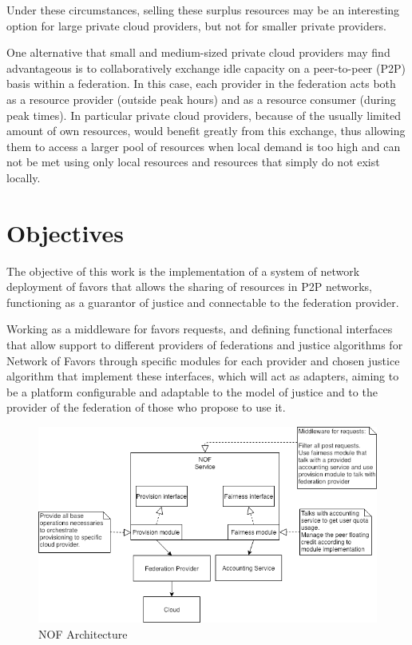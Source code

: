 \documentclass{article}
\begin{document}
Under these circumstances, selling these surplus resources may be an interesting option for large private cloud providers, but not for smaller private providers.

One alternative that small and medium-sized private cloud providers may find advantageous is to collaboratively exchange idle capacity on a peer-to-peer (P2P) basis within a federation. In this case, each provider in the federation acts both as a resource provider (outside peak hours) and as a resource consumer (during peak times). In particular private cloud providers, because of the usually limited amount of own resources, would benefit greatly from this exchange\cite{fairness-benefices}, thus allowing them to access a larger pool of resources when local demand is too high and can not be met using only local resources and resources that simply do not exist locally.

\section{Objectives}
The objective of this work is the implementation of a system of network deployment of favors that allows the sharing of resources in P2P networks, functioning as a guarantor of justice and connectable to the federation provider.

Working as a middleware for favors requests, and defining functional interfaces that allow support to different providers of federations and justice algorithms for Network of Favors through specific modules for each provider and chosen justice algorithm that implement these interfaces, which will act as adapters, aiming to be a platform configurable and adaptable to the model of justice and to the provider of the federation of those who propose to use it.

\begin{figure}
    \centering
    \includegraphics[scale=0.4]{./image/NOF-architecture-generic.png}
    \caption{NOF Architecture}
\end{figure}
\end{document}
